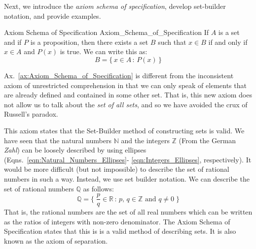             Next, we introduce the \textit{axiom schema of specification},
            develop set-builder notation, and provide examples.
            \begin{faxiom}{Axiom Schema of Specification}
                          {Axiom_Schema_of_Specification}
                If $A$ is a set and if $P$ is a proposition, then there exists
                a set $B$ such that $x\in{B}$ if and only if $x\in{A}$ and
                $P(x)$ is true. We can write this as:
                \begin{equation}
                    B=\{\,x\in{A}\,:\,P(x)\,\}
                \end{equation}
            \end{faxiom}
            Ax.~\ref{ax:Axiom_Schema_of_Specification} is different from the
            inconsistent axiom of unrestricted comprehension in that we can
            only speak of elements that are already defined and contained in
            some other set. That is, this new axiom does not allow us to talk
            about the \textit{set of all sets}, and so we have avoided the
            crux of Russell's paradox.
            \par\hfill\par
            This axiom states that the Set-Builder method of constructing
            sets is valid. We have seen that the natural numbers
            $\mathbb{N}$ and the integers $\mathbb{Z}$ (From the German
            \textit{Zahl}) can be loosely described by using ellipses
            (Eqns.~\ref{eqn:Natural_Numbers_Ellipses}-%
            \ref{eqn:Integers_Ellipses}, respectively). It would be more
            difficult (but not impossible) to describe the set of rational
            numbers in such a way. Instead, we use set builder notation. We
            can describe the set of rational numbers $\mathbb{Q}$ as follows:
            \begin{equation}
                \mathbb{Q}=\Big\{\;\frac{p}{q}\in\mathbb{R}\,:
                                   \,p,\,q\in\mathbb{Z}
                                   \textrm{ and }q\ne{0}\;\Big\}
            \end{equation}
            That is, the rational numbers are the set of all real numbers which
            can be written as the ratios of integers with non-zero denominator.
            The Axiom Schema of Specification states that this is is a valid
            method of describing sets. It is also known as the axiom of
            separation.
            \par\hfill\par
